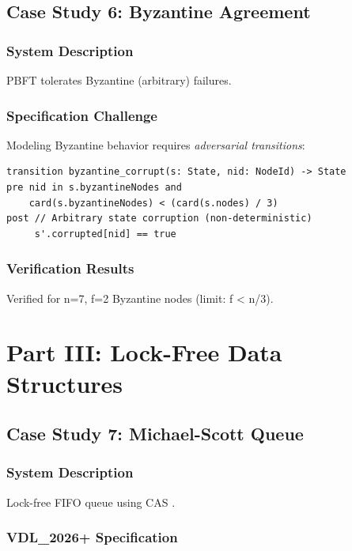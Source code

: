 \documentclass[conference]{IEEEtran}
\begin{document}
\subsection{Case Study 6: Byzantine Agreement}

\subsubsection{System Description}

PBFT \cite{castro1999} tolerates Byzantine (arbitrary) failures.

\subsubsection{Specification Challenge}

Modeling Byzantine behavior requires \textit{adversarial transitions}:

\begin{lstlisting}
transition byzantine_corrupt(s: State, nid: NodeId) -> State
pre nid in s.byzantineNodes and
    card(s.byzantineNodes) < (card(s.nodes) / 3)
post // Arbitrary state corruption (non-deterministic)
     s'.corrupted[nid] == true
\end{lstlisting}

\subsubsection{Verification Results}

Verified for n=7, f=2 Byzantine nodes (limit: f < n/3).

\section{Part III: Lock-Free Data Structures}

\subsection{Case Study 7: Michael-Scott Queue}

\subsubsection{System Description}

Lock-free FIFO queue using CAS \cite{michael1996}.

\subsubsection{VDL\_2026+ Specification}
\end{document}
